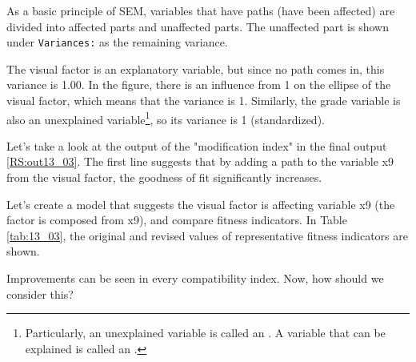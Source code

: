 \documentclass{ltjsbook}
\begin{document}
As a basic principle of SEM, variables that have paths (have been affected) are divided into affected parts and unaffected parts. The unaffected part is shown under \texttt{Variances:} as the remaining variance.

The visual factor is an explanatory variable, but since no path comes in, this variance is 1.00. In the figure, there is an influence from 1 on the ellipse of the visual factor, which means that the variance is 1. Similarly, the grade variable is also an unexplained variable\footnote{Particularly, an unexplained variable is called an . A variable that can be explained is called an .}, so its variance is 1 (standardized).



Let's take a look at the output of the "modification index" in the final output \ref{RS:out13_03}. The first line suggests that by adding a path to the variable x9 from the visual factor, the goodness of fit significantly increases.


Let's create a model that suggests the visual factor is affecting variable x9 (the factor is composed from x9), and compare fitness indicators. In Table \ref{tab:13_03}, the original and revised values of representative fitness indicators are shown.

Improvements can be seen in every compatibility index. Now, how should we consider this?
\end{document}
